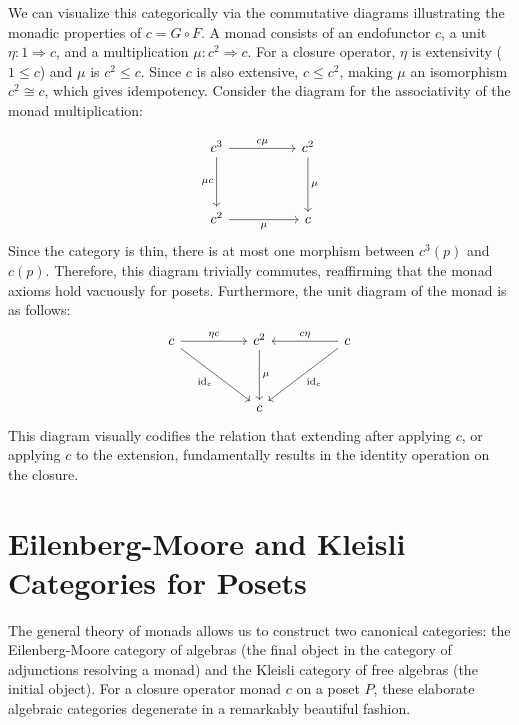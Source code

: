 We can visualize this categorically via the commutative diagrams illustrating the monadic properties of $c = G \circ F$. A monad consists of an endofunctor $c$, a unit $\eta: 1 \Rightarrow c$, and a multiplication $\mu: c^2 \Rightarrow c$. For a closure operator, $\eta$ is extensivity ($1 \leq c$) and $\mu$ is $c^2 \leq c$. Since $c$ is also extensive, $c \leq c^2$, making $\mu$ an isomorphism $c^2 \cong c$, which gives idempotency.
Consider the diagram for the associativity of the monad multiplication:

\[\begin{tikzcd}[row sep=huge, column sep=huge]
c^3 \arrow[r, "c \mu"] \arrow[d, "\mu c"'] & c^2 \arrow[d, "\mu"] \\
c^2 \arrow[r, "\mu"'] & c
\end{tikzcd}\]
Since the category is thin, there is at most one morphism between $c^3(p)$ and $c(p)$. Therefore, this diagram trivially commutes, reaffirming that the monad axioms hold vacuously for posets. Furthermore, the unit diagram of the monad is as follows:
\[\begin{tikzcd}[row sep=huge, column sep=huge]
c \arrow[r, "\eta c"] \arrow[dr, "\text{id}_{c}"'] & c^2 \arrow[d, "\mu"] & c \arrow[l, "c \eta"'] \arrow[dl, "\text{id}_{c}"] \\
& c &
\end{tikzcd}\]
This diagram visually codifies the relation that extending after applying $c$, or applying $c$ to the extension, fundamentally results in the identity operation on the closure.

\section{Eilenberg-Moore and Kleisli Categories for Posets}

The general theory of monads allows us to construct two canonical categories: the Eilenberg-Moore category of algebras (the final object in the category of adjunctions resolving a monad) and the Kleisli category of free algebras (the initial object). For a closure operator monad $c$ on a poset $P$, these elaborate algebraic categories degenerate in a remarkably beautiful fashion.

